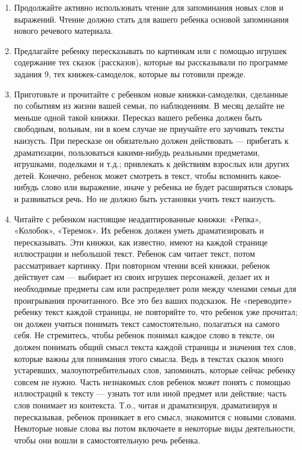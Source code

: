 \documentclass{book}
\begin{document}
\begin{enumerate}
\def\labelenumi{\arabic{enumi}.}
\setcounter{enumi}{1}
\item
  
  Продолжайте активно использовать чтение для запоминания новых слов и
  выражений. Чтение должно стать для вашего ребенка основой запоминания
  нового речевого материала.
  
\item
  
  Предлагайте ребенку пересказывать по картинкам или с помощью игрушек
  содержание тех сказок (рассказов), которые вы рассказывали по
  программе задания 9, тех книжек-самоделок, которые вы готовили прежде.
  
\item
  
  Приготовьте и прочитайте с ребенком новые книжки-самоделки, сделанные
  по событиям из жизни вашей семьи, по наблюдениям. В месяц делайте не
  меньше одной такой книжки. Пересказ вашего ребенка должен быть
  свободным, вольным, ни в коем случае не приучайте его заучивать тексты
  наизусть. При пересказе он обязательно должен действовать ---
  прибегать к драматизации, пользоваться какими-нибудь реальными
  предметами, игрушками, поделками и т.д.; привлекать к действиям
  взрослых или других детей. Конечно, ребенок может смотреть в текст,
  чтобы вспомнить какое-нибудь слово или выражение, иначе у ребенка не
  будет расширяться словарь и развиваться речь. Но не должно быть
  установки учить текст наизусть.
  
\item
  
  Читайте с ребенком настоящие неадаптированные книжки: «Репка»,
  «Колобок», «Теремок». Их ребенок должен уметь драматизировать и
  пересказывать. Эти книжки, как известно, имеют на каждой странице
  иллюстрации и небольшой текст. Ребенок сам читает текст, потом
  рассматривает картинку. При повторном чтении всей книжки, ребенок
  действует сам --- выбирает из своих игрушек персонажей, делает их и
  необходимые предметы сам или распределяет роли между членами семьи для
  проигрывания прочитанного. Все это без ваших подсказок. Не
  «переводите» ребенку текст каждой страницы, не повторяйте то, что
  ребенок уже прочитал; он должен учиться понимать текст самостоятельно,
  полагаться на самого себя. Не стремитесь, чтобы ребенок понимал каждое
  слово в тексте, он должен понимать общий смысл текста каждой страницы
  и значения тех слов, которые важны для понимания этого смысла. Ведь в
  текстах сказок много устаревших, малоупотребительных слов, запоминать,
  которые сейчас ребенку совсем не нужно. Часть незнакомых слов ребенок
  может понять с помощью иллюстраций к тексту --- узнать тот или иной
  предмет или действие; часть слов понимает из контекста. Т.о., читая и
  драматизируя, драматизируя и пересказывая, ребенок проникает в его
  смысл, знакомится с новыми словами. Некоторые новые слова вы потом
  включаете в некоторые виды деятельности, чтобы они вошли в
  самостоятельную речь ребенка.
  
\end{enumerate}
\end{document}
